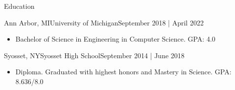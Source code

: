 \documentclass[]{mcdowellcv}
\begin{document}
    \makeheader
          

    \begin{cvsection}{Education}
        \begin{cvsubsection}{Ann Arbor, MI}{University of Michigan}{September 2018 | April 2022}
            \begin{itemize}
                \item 
                    Bachelor of Science in Engineering in Computer Science. 
                    \hfill {GPA: 4.0}
                    \vspace*{-4pt}
            \end{itemize}
        \end{cvsubsection}
        \begin{cvsubsection}{Syosset, NY}{Syosset High School}{September 2014 | June 2018}
            \begin{itemize}
                \item 
                    Diploma. Graduated with highest honors and Mastery in Science.
                    \hfill {GPA: 8.636/8.0}
                    \vspace*{-4pt}
            \end{itemize}
        \end{cvsubsection}
    \end{cvsection}
\end{document}
